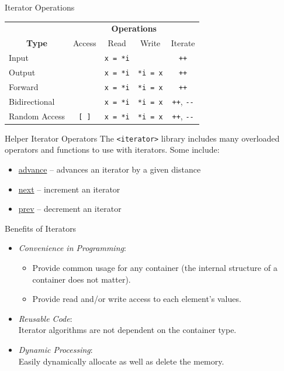\documentclass[14pt,aspectratio=1610]{beamer}
\begin{document}
\begin{frame}[fragile]{Iterator Operations}
\begin{center}\large
\begin{tabular} {l c c c c}
 & \multicolumn{4}{c}{\bfseries Operations}\\
\multicolumn{1}{c}{\bfseries Type} & {Access} & {Read} & {Write} & {Iterate}\\
Input         &               & \lstinline$x = *i$ &               &  \lstinline$++$\\
Output        &               & \lstinline$x = *i$ &  \lstinline$*i = x$ &  \lstinline$++$\\
Forward       &               & \lstinline$x = *i$ &  \lstinline$*i = x$ &  \lstinline$++$\\
Bidirectional &               & \lstinline$x = *i$ &  \lstinline$*i = x$ &  \lstinline$++$, \lstinline$--$\\
Random Access &\lstinline$[ ]$ & \lstinline$x = *i$ &  \lstinline$*i = x$ &  \lstinline$++$, \lstinline$--$\\
\end{tabular}
\end{center}
\end{frame}

\begin{frame}[fragile]{Helper Iterator Operators}
  The \lstinline|<iterator>| library includes many overloaded operators and functions to use with iterators. Some include:
  \begin{itemize}
    \item \href{https://en.cppreference.com/w/cpp/iterator/advance}{advance} -- advances an iterator by a given distance
    \item \href{https://en.cppreference.com/w/cpp/iterator/next}{next} -- increment an iterator
    \item \href{https://en.cppreference.com/w/cpp/iterator/prev}{prev} -- decrement an iterator 
  \end{itemize} 

\end{frame}

\begin{frame}{Benefits of Iterators}
\begin{itemize}
\item<2->
  \emph{Convenience in Programming}:
  \begin{itemize}
  \item
    Provide common usage for any container (the internal structure of a container does not matter).
  \item
    Provide read and/or write access to each element's values.
  \end{itemize}
\item<3->
  \emph{Reusable Code}:\\
  Iterator algorithms are not dependent on the container type.
\item<4->
  \emph{Dynamic Processing}:\\
  Easily dynamically allocate as well as delete the memory.
\end{itemize}
\end{frame}
\end{document}
